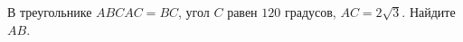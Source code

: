 \begin{ex}
	\begin{condition}
		В треугольнике \( ABC AC = BC \), угол \( C \) равен \( 120 \) градусов, \( AC = 2\sqrt{3} \). Найдите \( AB \).
	\end{condition}
\end{ex}